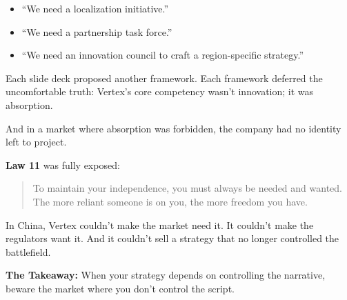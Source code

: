\medskip

\begin{itemize}
  \item “We need a localization initiative.”
  \item “We need a partnership task force.”
  \item “We need an innovation council to craft a region-specific strategy.”
\end{itemize}

Each slide deck proposed another framework.  Each framework deferred the uncomfortable truth:  Vertex’s core competency wasn’t innovation; it was absorption.

And in a market where absorption was forbidden, the company had no identity left to project.

\medskip

\textbf{Law 11} was fully exposed:
\begin{quote}
To maintain your independence, you must always be needed and wanted. The more reliant someone is on you, the more freedom you have.
\end{quote}

In China, Vertex couldn’t make the market need it.  It couldn’t make the regulators want it.  And it couldn’t sell a strategy that no longer controlled the battlefield.

\medskip

\textbf{The Takeaway:}  When your strategy depends on controlling the narrative, beware the market where you don’t control the script.
